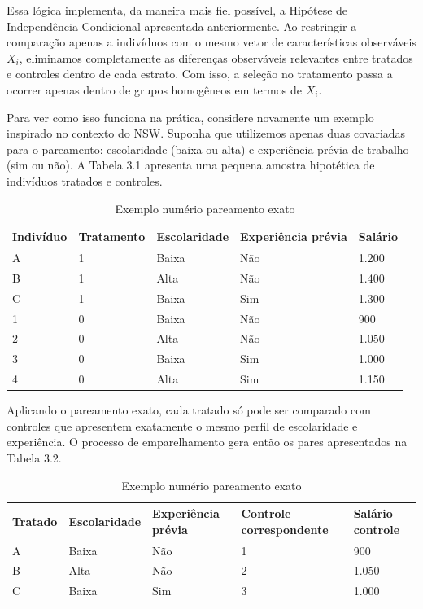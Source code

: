 Essa lógica implementa, da maneira mais fiel possível, a Hipótese de Independência Condicional apresentada anteriormente. Ao restringir a comparação apenas a indivíduos com o mesmo vetor de características observáveis $X_i$, eliminamos completamente as diferenças observáveis relevantes entre tratados e controles dentro de cada estrato. Com isso, a seleção no tratamento passa a ocorrer apenas dentro de grupos homogêneos em termos de $X_i$.

Para ver como isso funciona na prática, considere novamente um exemplo inspirado no contexto do NSW. Suponha que utilizemos apenas duas covariadas para o pareamento: escolaridade (baixa ou alta) e experiência prévia de trabalho (sim ou não). A Tabela 3.1 apresenta uma pequena amostra hipotética de indivíduos tratados e controles.

\begin{table}[h]
    \centering
    \begin{tabular}{lllll}
       Indivíduo  & Tratamento & Escolaridade & Experiência prévia & Salário \\\midrule
        A & 1 & Baixa & Não & 1.200\\
        B & 1 & Alta & Não & 1.400 \\
        C & 1 & Baixa & Sim & 1.300 \\
        1 & 0 & Baixa & Não & 900 \\
        2 & 0 & Alta & Não & 1.050\\
        3 & 0 & Baixa & Sim & 1.000 \\
        4 & 0 & Alta & Sim & 1.150\\
        \bottomrule
    \end{tabular}
    \caption{Exemplo numério pareamento exato}
    \label{tab:placeholder}
\end{table}

Aplicando o pareamento exato, cada tratado só pode ser comparado com controles que apresentem exatamente o mesmo perfil de escolaridade e experiência. O processo de emparelhamento gera então os pares apresentados na Tabela 3.2.

\begin{table}[h]
    \centering
    \begin{tabular}{lllll}
       Tratado  & Escolaridade & Experiência prévia & Controle correspondente & Salário controle \\\midrule
        A & Baixa &  Não  & 1 & 900\\
        B & Alta   & Não &  2 & 1.050 \\
        C & Baixa  & Sim  & 3 & 1.000 \\
        \bottomrule
    \end{tabular}
    \caption{Exemplo numério pareamento exato}
    \label{tab:placeholder}
\end{table}

